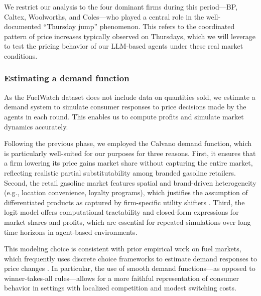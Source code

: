 We restrict our analysis to the four dominant firms during this period---BP, Caltex, Woolworths, and Coles---who played a central role in the well-documented “Thursday jump” phenomenon. This refers to the coordinated pattern of price increases typically observed on Thursdays, which we will leverage to test the pricing behavior of our LLM-based agents under these real market conditions.

\subsubsection*{Estimating a demand function}

As the FuelWatch dataset does not include data on quantities sold, we estimate a demand system to simulate consumer responses to price decisions made by the agents in each round. This enables us to compute profits and simulate market dynamics accurately.

Following the previous phase, we employed the Calvano demand function, which is particularly well-suited for our purposes for three reasons. First, it ensures that a firm lowering its price gains market share without capturing the entire market, reflecting realistic partial substitutability among branded gasoline retailers. Second, the retail gasoline market features spatial and brand-driven heterogeneity (e.g., location convenience, loyalty programs), which justifies the assumption of differentiated products as captured by firm-specific utility shifters \parencite{hastings_vertical_2004, byrne_learning_2019}. Third, the logit model offers computational tractability and closed-form expressions for market shares and profits, which are essential for repeated simulations over long time horizons in agent-based environments.

This modeling choice is consistent with prior empirical work on fuel markets, which frequently uses discrete choice frameworks to estimate demand responses to price changes \parencite{hastings_fungibility_2013, houde_spatial_2012}. In particular, the use of smooth demand functions---as opposed to winner-takes-all rules---allows for a more faithful representation of consumer behavior in settings with localized competition and modest switching costs.



